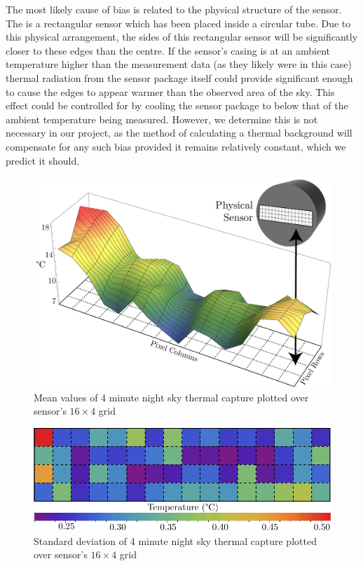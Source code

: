 \documentclass[../thesis/thesis.tex]{subfiles}
\begin{document}
The most likely cause of bias is related to the physical structure of the sensor. The \mlx is a rectangular sensor which has been placed inside a circular tube. Due to this physical arrangement, the sides of this rectangular sensor will be significantly closer to these edges than the centre. If the sensor's casing is at an ambient temperature higher than the measurement data (as they likely were in this case) thermal radiation from the sensor package itself could provide significant enough to cause the edges to appear warmer than the observed area of the sky. This effect could be controlled for by cooling the sensor package to below that of the ambient temperature being measured. However, we determine this is not necessary in our project, as the method of calculating a thermal background will compensate for any such bias provided it remains relatively constant, which we predict it should.

\begin{figure}
\centering
\includegraphics[width=\textwidth]{../diagrams/rest-avg-embed.pdf}
\caption{Mean values of 4 minute night sky thermal capture plotted over sensor's $16\times4$ grid}
\label{fig:meanplot}
\end{figure}

\begin{figure}
\centering
\includegraphics[width=\textwidth]{../diagrams/stddev-contour2.pdf}
\caption{Standard deviation of 4 minute night sky thermal capture plotted over sensor's $16\times4$ grid}
\label{fig:stdplot}
\end{figure}
\end{document}
